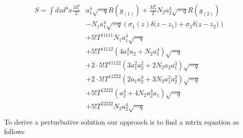 \documentclass[11pt]{report}
\numberwithin{equation}{chapter}
\begin{document}
\begin{align}
    S=\int dzd^4x\frac{M_1^{3}}{2}&a_1^4\sqrt{-q}R(g_{(1)})+ \frac{M_2^{3}}{2}N_2a_2^4\sqrt{-q}R(g_{(2)})\\ \nonumber
    &-N_1a_1^4\sqrt{-q}\left(\sigma_1(z)\delta\big(z-z_1\big)+\sigma_2\delta\big(z-z_2\big)\right)\\ \nonumber
    &+5!T^{11111}N_1a_1^4\sqrt{-q}\\ \nonumber
    &+5!T^{11112}\left(4a_1^3a_2+N_2a_1^4\right)\sqrt{-q}\\ \nonumber
    &+2\cdot5!T^{11122}\left(3a_1^2a_2^2+2N_2a_2a_1^3\right)\sqrt{-q}\\ \nonumber
    &+2\cdot5!T^{11222}\left(2a_1a^3_2+3N_2a_1^2a_2^2\right)\sqrt{-q}\\ \nonumber
    &+5!T^{12222}\left(a_2^4+4N_2a_2^3a_1\right)\sqrt{-q}\\ \nonumber
    &+5!T^{22222}N_2a_2^4\sqrt{-q}\\ \nonumber
\end{align}
To derive a perturbative solution our approach is to find a mtrix equation as follows
\end{document}
